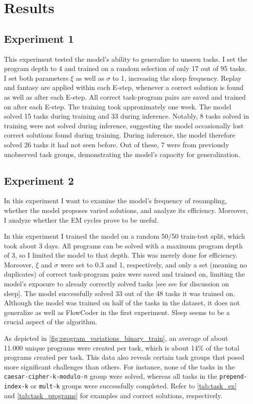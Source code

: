 \section{Results}\label{sec:results}
\subsection{Experiment 1}\label{sec:exp1}
This experiment tested the model's ability to generalize to unseen tasks. I set the program depth to 4 and trained on a random selection of only 17 out of 95 tasks. I set both parameters $\xi$ as well as $\sigma$ to 1, increasing the sleep frequency.
Replay and fantasy are applied within each E-step, whenever a correct solution is found as well as after each E-step.
All correct task-program pairs are saved and trained on after each E-step. The training took approximately one week. The model solved 15 tasks during training and 33 during inference. Notably, 8 tasks solved in training were not solved during inference, suggesting the model occasionally lost correct solutions found during training. During inference, the model therefore solved 26 tasks it had not seen before. Out of these, 7 were from previously unobserved task groups, demonstrating the model's capacity for generalization.

\subsection{Experiment 2}\label{sec:exp2}
In this experiment I want to examine the model's frequency of resampling, whether the model proposes varied solutions, and analyze its efficiency. Moreover, I analyze whether the EM cycles prove to be useful.

In this experiment I trained the model on a random 50/50 train-test split, which took about 3 days. All programs can be solved with a maximum program depth of 3, so I limited the model to that depth. This was merely done for efficiency. Moreover, $\xi$ and $\sigma$ were set to 0.3 and 1, respectively, and only a set (meaning no duplicates) of correct task-program pairs were saved and trained on, limiting the model's exposure to already correctly solved tasks [see sec for discussion on sleep]. 
The model successfully solved 33 out of the 48 tasks it was trained on. Although the model was trained on half of the tasks in the dataset, it does not generalize as well as FlowCoder in the first experiment. Sleep seems to be a crucial aspect of the algorithm.

As depicted in \autoref{fig:program_variations_binary_train}, an average of about 11.000 unique programs were created per task, which is about 14\% of the total programs created per task. This data also reveals certain task groups that posed more significant challenges than others. For instance, none of the tasks in the \texttt{caesar-cipher-k-modulo-n} group were solved, whereas all tasks in the \texttt{prepend-index-k} or \texttt{mult-k} groups were successfully completed. Refer to \autoref{tab:task_ex} and \autoref{tab:task_programs} for examples and correct solutions, respectively.

